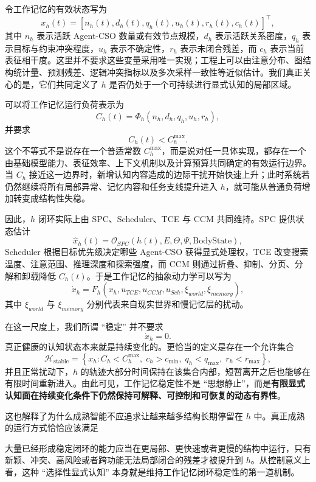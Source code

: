令工作记忆的有效状态写为
\[
x_h(t)
=
\left[
n_h(t),
d_h(t),
q_h(t),
u_h(t),
r_h(t),
c_h(t)
\right]^{\top},
\]
其中 $n_h$ 表示活跃 Agent-CSO 数量或有效节点规模，$d_h$ 表示活跃关系密度，$q_h$ 表示目标与约束冲突程度，$u_h$ 表示不确定性，$r_h$ 表示未闭合残差，而 $c_h$ 表示当前表征相干度。这里并不要求这些变量采用唯一实现；工程上可以由注意分布、图结构统计量、预测残差、逻辑冲突指标以及多次采样一致性等近似估计。我们真正关心的是，它们共同定义了 $h$ 是否仍处于一个可持续进行显式认知的局部区域。

可以将工作记忆运行负荷表示为
\[
C_h(t)
=
\Phi_h
\left(
n_h,d_h,q_h,u_h,r_h
\right),
\]
并要求
\[
C_h(t)
<
C_h^{\max}.
\]
这个不等式不是说存在一个普适常数 $C_h^{\max}$，而是说对任一具体实现，都存在一个由基础模型能力、表征效率、上下文机制以及计算预算共同确定的有效运行边界。当 $C_h$ 接近这一边界时，新增认知内容造成的边际干扰开始快速上升；此时系统若仍然继续将所有局部异常、记忆内容和任务支线提升进入 $h$，就可能从普通负荷增加转变成结构性失稳。

因此，$h$ 闭环实际上由 SPC、Scheduler、TCE 与 CCM 共同维持。SPC 提供状态估计
\[
\hat{x}_h(t)
=
\mathcal O_{SPC}
\left(
h(t),E,\Theta,\Psi,\text{BodyState}
\right),
\]
Scheduler 根据目标优先级决定哪些 Agent-CSO 获得显式处理权，TCE 改变搜索温度、注意范围、推理深度和探索强度，而 CCM 则通过折叠、抑制、分页、分解和卸载降低 $C_h(t)$。于是工作记忆的抽象动力学可以写为
\[
\dot{x}_h
=
F_h
\left(
x_h,
u_{TCE},
u_{CCM},
u_{Sch},
\xi_{world},
\xi_{memory}
\right),
\]
其中 $\xi_{world}$ 与 $\xi_{memory}$ 分别代表来自现实世界和慢记忆层的扰动。

在这一尺度上，我们所谓 ``稳定'' 并不要求
\[
\dot{x}_h=0.
\]
真正健康的认知状态本来就是持续变化的。更恰当的定义是存在一个允许集合
\[
\mathcal H_{\mathrm{stable}}
=
\left\{
x_h:
C_h<C_h^{\max},
\;
c_h>c_{\min},
\;
q_h<q_{\max},
\;
r_h<r_{\max}
\right\},
\]
并且正常扰动下，$h$ 的轨迹大部分时间保持在该集合内部，短暂离开之后也能够在有限时间重新进入。由此可见，工作记忆稳定性不是 ``思想静止''，而是\textbf{有限显式认知面在持续变化条件下仍然保持可解释、可控制和可恢复的动态有界性}。

这也解释了为什么成熟智能不应追求让越来越多结构长期停留在 $h$ 中。真正成熟的运行方式恰恰应该满足
\begin{statementbox}
\centering
{}
\end{statementbox}
大量已经形成稳定闭环的能力应当在更局部、更快速或者更慢的结构中运行，只有新颖、冲突、高风险或者跨功能无法局部闭合的残差才被提升到 $h$。从控制意义上看，这种 ``选择性显式认知'' 本身就是维持工作记忆闭环稳定性的第一道机制。

